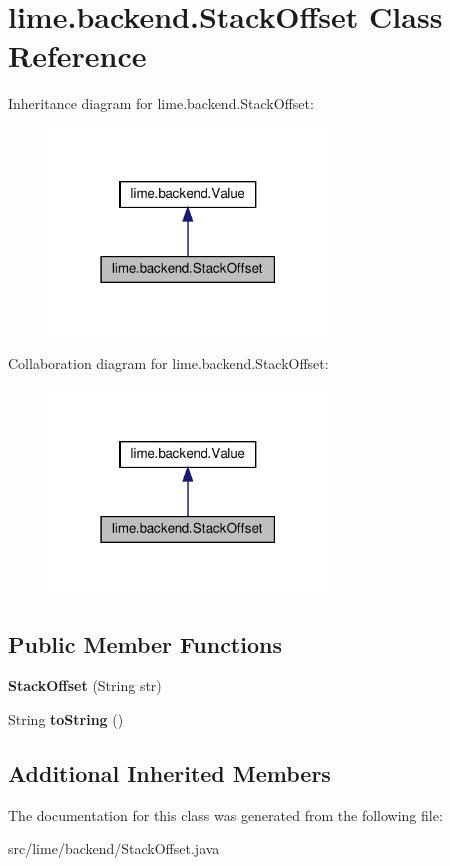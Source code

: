 \hypertarget{classlime_1_1backend_1_1StackOffset}{}\section{lime.\+backend.\+Stack\+Offset Class Reference}
\label{classlime_1_1backend_1_1StackOffset}


Inheritance diagram for lime.\+backend.\+Stack\+Offset\+:
\nopagebreak
\begin{figure}[H]
\begin{center}
\leavevmode
\includegraphics[width=210pt]{classlime_1_1backend_1_1StackOffset__inherit__graph}
\end{center}
\end{figure}


Collaboration diagram for lime.\+backend.\+Stack\+Offset\+:
\nopagebreak
\begin{figure}[H]
\begin{center}
\leavevmode
\includegraphics[width=210pt]{classlime_1_1backend_1_1StackOffset__coll__graph}
\end{center}
\end{figure}
\subsection*{Public Member Functions}
\begin{DoxyCompactItemize}
\item 
\mbox{\label{classlime_1_1backend_1_1StackOffset_a9d764ed11b28e716f5a4427c8a3f9386}} 
{\bfseries Stack\+Offset} (String str)
\item 
\mbox{\label{classlime_1_1backend_1_1StackOffset_a6b198f2856ca626618b83f70220af5e1}} 
String {\bfseries to\+String} ()
\end{DoxyCompactItemize}
\subsection*{Additional Inherited Members}


The documentation for this class was generated from the following file\+:\begin{DoxyCompactItemize}
\item 
src/lime/backend/Stack\+Offset.\+java\end{DoxyCompactItemize}
